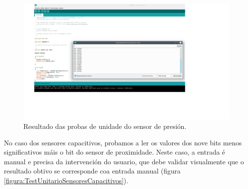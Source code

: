   \begin{figure}[htbp]
   \centering
   \includegraphics[scale=0.4,angle=90,keepaspectratio=true]{./imagenes/resultado-test-sensor-presion.png}
   \caption{Resultado das probas de unidade do sensor de presión.}
   \label{figura:ResultadoTestUnitarioSensorPresion}
  \end{figure}
  
  No caso dos sensores capacitivos, probamos a ler os valores dos nove bits
  menos significativos máis o bit do sensor de proximidade. Neste caso, a
  entrada é manual e precisa da intervención do usuario, que debe validar
  visualmente que o resultado obtivo se corresponde coa entrada manual
  (figura \ref{figura:TestUnitarioSensoresCapacitivos}). \\
   
